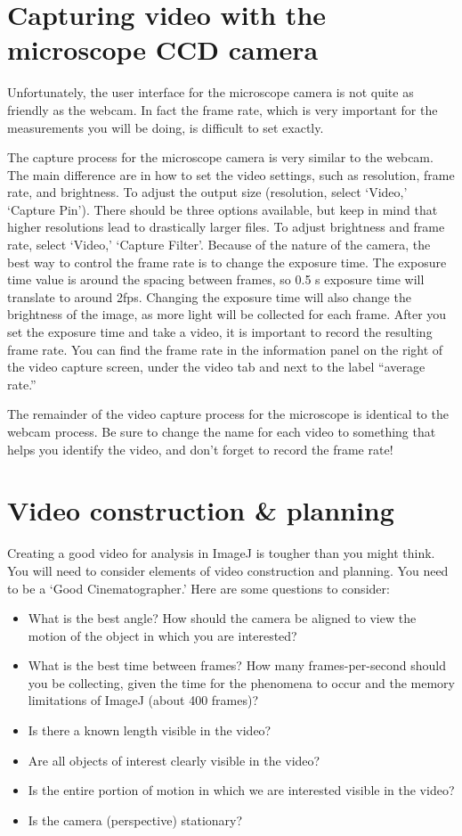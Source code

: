 \section*{Capturing video with the microscope CCD camera}
Unfortunately, the user interface for the microscope camera is not quite as friendly as the webcam. 
In fact the frame rate, which is very important for the measurements you will be doing, is difficult to set exactly. 
\par 
The capture process for the microscope camera is very similar to the webcam. 
The main difference are in how to set the video settings, such as resolution, frame rate, and brightness. 
To adjust the output size (resolution, select ‘Video,’ ‘Capture Pin’). 
There should be three options available, but keep in mind that higher resolutions lead to drastically larger files. 
To adjust brightness and frame rate, select ‘Video,’ ‘Capture Filter’. 
Because of the nature of the camera, the best way to control the frame rate is to change the exposure time. 
The exposure time value is around the spacing  between frames, so 0.5 s exposure time will translate to around 2fps. 
Changing the exposure time will also change the brightness of the image, as more light will be collected for each frame. 
After you set the exposure time and take a video, it is important to record the resulting frame rate. 
You can find the frame rate in the information panel on the right of the video capture screen, under the video tab and next to the label “average rate.” 
\par 
The remainder of the video capture process for the microscope is identical to the webcam process. 
Be sure to change the name for each video to something that helps you identify the video, and don’t forget to record the frame rate!
\section*{Video construction \& planning}
Creating a good video for analysis in ImageJ is tougher than you might think. 
You will need to consider elements of video construction and planning. 
You need to be a ‘Good Cinematographer.’ 
Here are some questions to consider:
\begin{itemize}
\item What is the best angle? How should the camera be aligned to view the motion of the object
in which you are interested?
\item What is the best time between frames? How many frames-per-second should you be collecting, given the time for the phenomena to occur and the memory limitations of ImageJ (about 400 frames)?
\item Is there a known length visible in the video?
\item Are all objects of interest clearly visible in the video?
\item Is the entire portion of motion in which we are interested visible in the video?
\item Is the camera (perspective) stationary?
\end{itemize}
